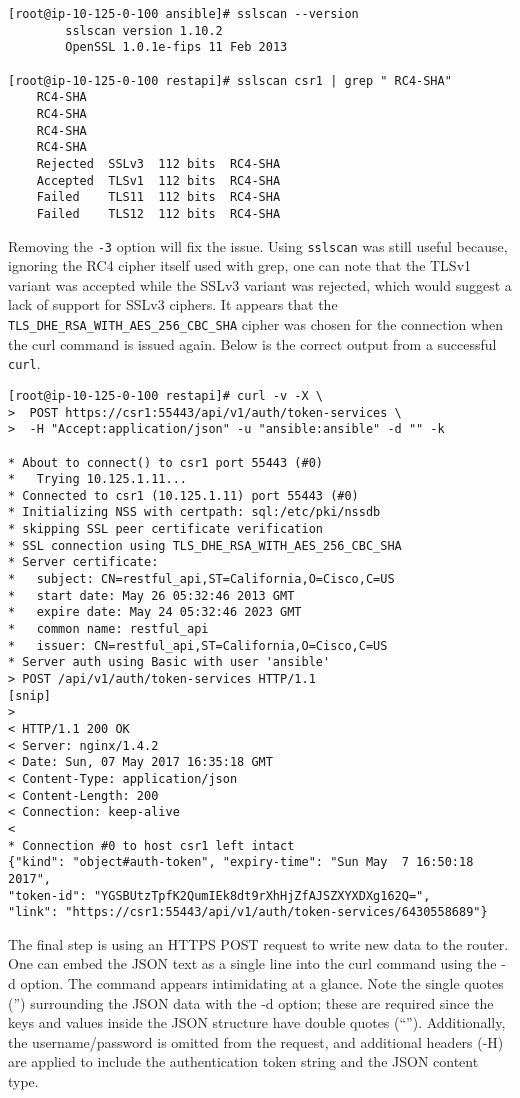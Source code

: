 \begin{verbatim}
[root@ip-10-125-0-100 ansible]# sslscan --version
		sslscan version 1.10.2 
		OpenSSL 1.0.1e-fips 11 Feb 2013

[root@ip-10-125-0-100 restapi]# sslscan csr1 | grep " RC4-SHA"
    RC4-SHA
    RC4-SHA
    RC4-SHA
    RC4-SHA
    Rejected  SSLv3  112 bits  RC4-SHA
    Accepted  TLSv1  112 bits  RC4-SHA
    Failed    TLS11  112 bits  RC4-SHA
    Failed    TLS12  112 bits  RC4-SHA
\end{verbatim}

Removing the \verb|-3| option will fix the issue. Using \verb|sslscan| was still
useful because, ignoring the RC4 cipher itself used with grep, one can note
that the TLSv1 variant was accepted while the SSLv3 variant was rejected,
which would suggest a lack of support for SSLv3 ciphers. It appears that the
\verb|TLS_DHE_RSA_WITH_AES_256_CBC_SHA| cipher was chosen for the connection
when the curl command is issued again. Below is the correct output from a
successful \verb|curl|.

\begin{verbatim}
[root@ip-10-125-0-100 restapi]# curl -v -X \
>  POST https://csr1:55443/api/v1/auth/token-services \
>  -H "Accept:application/json" -u "ansible:ansible" -d "" -k

* About to connect() to csr1 port 55443 (#0)
*   Trying 10.125.1.11...
* Connected to csr1 (10.125.1.11) port 55443 (#0)
* Initializing NSS with certpath: sql:/etc/pki/nssdb
* skipping SSL peer certificate verification
* SSL connection using TLS_DHE_RSA_WITH_AES_256_CBC_SHA
* Server certificate:
* 	subject: CN=restful_api,ST=California,O=Cisco,C=US
* 	start date: May 26 05:32:46 2013 GMT
* 	expire date: May 24 05:32:46 2023 GMT
* 	common name: restful_api
* 	issuer: CN=restful_api,ST=California,O=Cisco,C=US
* Server auth using Basic with user 'ansible'
> POST /api/v1/auth/token-services HTTP/1.1
[snip]
> 
< HTTP/1.1 200 OK
< Server: nginx/1.4.2
< Date: Sun, 07 May 2017 16:35:18 GMT
< Content-Type: application/json
< Content-Length: 200
< Connection: keep-alive
< 
* Connection #0 to host csr1 left intact
{"kind": "object#auth-token", "expiry-time": "Sun May  7 16:50:18 2017",
"token-id": "YGSBUtzTpfK2QumIEk8dt9rXhHjZfAJSZXYXDXg162Q=",
"link": "https://csr1:55443/api/v1/auth/token-services/6430558689"}
\end{verbatim}

The final step is using an HTTPS POST request to write new data to the router.
One can embed the JSON text as a single line into the curl command using the
-d option. The command appears intimidating at a glance. Note the single
quotes ('') surrounding the JSON data with the -d option; these are required
since the keys and values inside the JSON structure have double quotes (``'').
Additionally, the username/password is omitted from the request, and
additional headers (-H) are applied to include the authentication token string
and the JSON content type.

